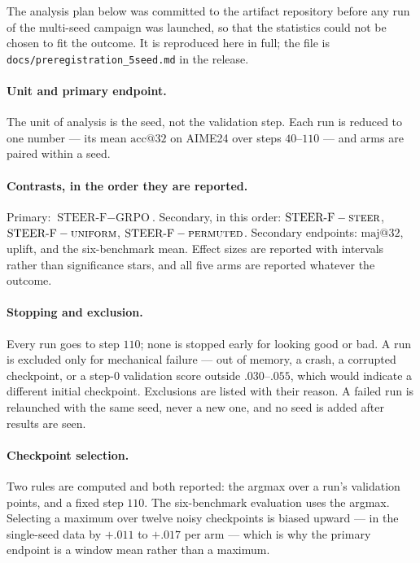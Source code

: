 \documentclass[11pt]{article}
\begin{document}
The analysis plan below was committed to the artifact repository before any run of
the multi-seed campaign was launched, so that the statistics could not be chosen to
fit the outcome. It is reproduced here in full; the file is
\texttt{docs/preregistration\_5seed.md} in the release.

\paragraph{Unit and primary endpoint.} The unit of analysis is the seed, not the
validation step. Each run is reduced to one number --- its mean $\mathrm{acc@}32$ on
AIME24 over steps $40$--$110$ --- and arms are paired within a seed.

\paragraph{Contrasts, in the order they are reported.} Primary: $\text{STEER-F} -
\text{GRPO}$. Secondary, in this order: $\text{STEER-F} - \textsc{steer}$,
$\text{STEER-F} - \textsc{uniform}$, $\text{STEER-F} - \textsc{permuted}$. Secondary
endpoints: $\mathrm{maj@}32$, uplift, and the six-benchmark mean. Effect sizes are
reported with intervals rather than significance stars, and all five arms are
reported whatever the outcome.

\paragraph{Stopping and exclusion.} Every run goes to step $110$; none is stopped
early for looking good or bad. A run is excluded only for mechanical failure --- out
of memory, a crash, a corrupted checkpoint, or a step-$0$ validation score outside
$.030$--$.055$, which would indicate a different initial checkpoint. Exclusions are
listed with their reason. A failed run is relaunched with the same seed, never a new
one, and no seed is added after results are seen.

\paragraph{Checkpoint selection.} Two rules are computed and both reported: the
argmax over a run's validation points, and a fixed step $110$. The six-benchmark
evaluation uses the argmax. Selecting a maximum over twelve noisy checkpoints is
biased upward --- in the single-seed data by $+.011$ to $+.017$ per arm --- which is
why the primary endpoint is a window mean rather than a maximum.
\end{document}
